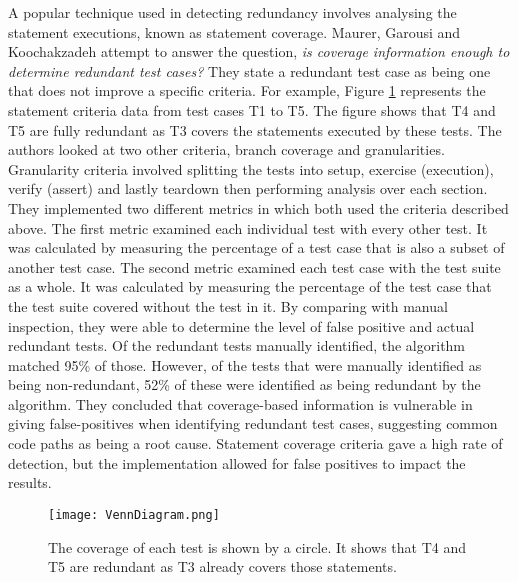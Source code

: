 A popular technique used in detecting redundancy involves analysing the statement executions, known as statement coverage. Maurer, Garousi and Koochakzadeh \cite{koochakzadeh2009test} attempt to answer the question, \textit{is coverage information enough to determine redundant test cases?} They state a redundant test case as being one that does not improve a specific criteria. For example, Figure \ref{fig:venndiagram} represents the statement criteria data from test cases T1 to T5. The figure shows that T4 and T5 are fully redundant as T3 covers the statements executed by these tests. The authors looked at two other criteria, branch coverage and granularities. Granularity criteria involved splitting the tests into setup, exercise (execution), verify (assert) and lastly teardown then performing analysis over each section. They implemented two different metrics in which both used the criteria described above. The first metric examined each individual test with every other test. It was calculated by measuring the percentage of a test case that is also a subset of another test case. The second metric examined each test case with the test suite as a whole. It was calculated by measuring the percentage of the test case that the test suite covered without the test in it. By comparing with manual inspection, they were able to determine the level of false positive and actual redundant tests. Of the redundant tests manually identified, the algorithm matched 95\% of those. However, of the tests that were manually identified as being non-redundant, 52\% of these were identified as being redundant by the algorithm. They concluded that coverage-based information is vulnerable in giving false-positives when identifying redundant test cases, suggesting common code paths as being a root cause. Statement coverage criteria gave a high rate of detection, but the implementation allowed for false positives to impact the results. 

\begin{figure}[h]
\begin{center}
\texttt{[image: VennDiagram.png]}
\end{center}
\caption{The coverage of each test is shown by a circle. It shows that T4 and T5 are redundant as T3 already covers those statements.}
\label{fig:venndiagram}
\end{figure}

